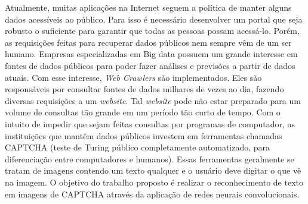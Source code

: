 \begin{resumo}
        
Atualmente, muitas aplicações na Internet seguem a política de manter
alguns dados acessíveis ao público. Para isso é necessário desenvolver
um portal que seja robusto o suficiente para garantir que todas as
pessoas possam acessá-lo. Porém, as requisições feitas para recuperar
dados públicos nem sempre vêm de um ser humano. Empresas
especializadas em Big data possuem um grande interesse em fontes de
dados públicos para poder fazer análises e previsões a partir de dados
atuais. Com esse interesse, \textit{Web Crawlers} são
implementados. Eles são responsáveis por consultar fontes de dados
milhares de vezes ao dia, fazendo diversas requisições a um
\textit{website}. Tal \textit{website} pode não estar preparado para
um volume de consultas tão grande em um período tão curto de
tempo. Com o intuito de impedir que sejam feitas consultas por
programas de computador, as instituições que mantêm dados públicos
investem em ferramentas chamadas CAPTCHA (teste de Turing público
completamente automatizado, para diferenciação entre computadores e
humanos). Essas ferramentas geralmente se tratam de imagens contendo
um texto qualquer e o usuário deve digitar o que vê na imagem. O
objetivo do trabalho proposto é realizar o reconhecimento de texto em
imagens de CAPTCHA através da aplicação de redes neurais
convolucionais.

\end{resumo}
